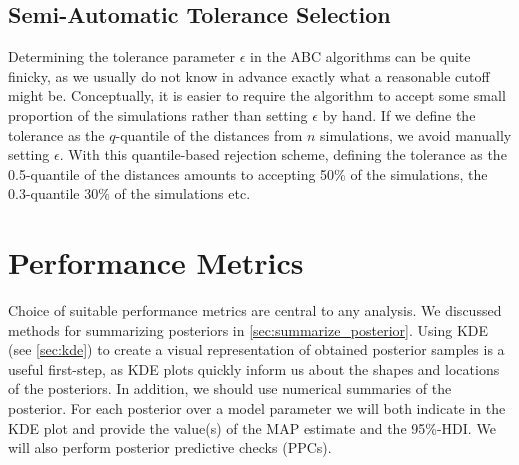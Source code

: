 \subsection{Semi-Automatic Tolerance Selection}

Determining the tolerance parameter $\epsilon$ in the ABC algorithms can be quite finicky, as we usually do not know in advance exactly what a reasonable cutoff might be. Conceptually, it is easier to require the algorithm to accept some small proportion of the simulations rather than setting $\epsilon$ by hand. If we define the tolerance as the $q$-quantile of the distances from $n$ simulations, we avoid manually setting $\epsilon$. With this quantile-based rejection scheme, defining the tolerance as the 0.5-quantile of the distances amounts to accepting 50\% of the simulations, the 0.3-quantile 30\% of the simulations etc. 





\section{Performance Metrics}\label{sec:performance_metrics}

Choice of suitable performance metrics are central to any analysis. We discussed methods for summarizing posteriors in \cref{sec:summarize_posterior}. Using KDE (see \cref{sec:kde}) to create a visual representation of obtained posterior samples is a useful first-step, as KDE plots quickly inform us about the shapes and locations of the posteriors. In addition, we should use numerical summaries of the posterior. For each posterior over a model parameter we will both indicate in the KDE plot and provide the value(s) of the MAP estimate and the 95\%-HDI. We will also perform posterior predictive checks (PPCs). 

